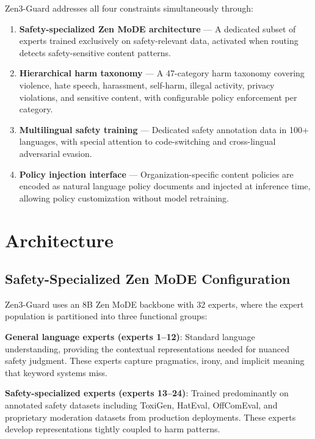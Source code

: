 \documentclass[11pt,a4paper]{article}
\begin{document}
Zen3-Guard addresses all four constraints simultaneously through:

\begin{enumerate}
\item \textbf{Safety-specialized Zen MoDE architecture} --- A dedicated subset of
      experts trained exclusively on safety-relevant data, activated when routing
      detects safety-sensitive content patterns.
\item \textbf{Hierarchical harm taxonomy} --- A 47-category harm taxonomy covering
      violence, hate speech, harassment, self-harm, illegal activity, privacy violations,
      and sensitive content, with configurable policy enforcement per category.
\item \textbf{Multilingual safety training} --- Dedicated safety annotation data in
      100+ languages, with special attention to code-switching and cross-lingual
      adversarial evasion.
\item \textbf{Policy injection interface} --- Organization-specific content policies
      are encoded as natural language policy documents and injected at inference time,
      allowing policy customization without model retraining.
\end{enumerate}

\section{Architecture}
\label{sec:arch}

\subsection{Safety-Specialized Zen MoDE Configuration}

Zen3-Guard uses an 8B Zen MoDE backbone with 32 experts, where the expert population
is partitioned into three functional groups:

\textbf{General language experts (experts 1--12)}: Standard language understanding,
providing the contextual representations needed for nuanced safety judgment. These
experts capture pragmatics, irony, and implicit meaning that keyword systems miss.

\textbf{Safety-specialized experts (experts 13--24)}: Trained predominantly on
annotated safety datasets including ToxiGen, HatEval, OffComEval, and proprietary
moderation datasets from production deployments. These experts develop representations
tightly coupled to harm patterns.
\end{document}
